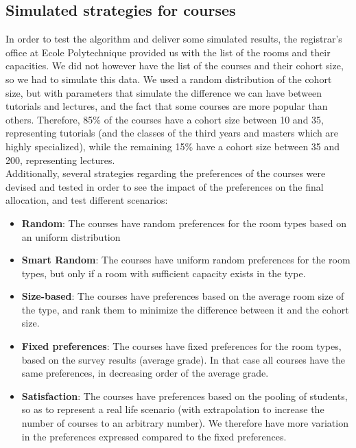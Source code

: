 \documentclass[a4paper, oneside]{article}
\theoremstyle{plain}
\begin{document}
\subsection{Simulated strategies for courses}

In order to test the algorithm and deliver some simulated results, the registrar's office at Ecole Polytechnique provided us with the list of the rooms and their capacities.
We did not however have the list of the courses and their cohort size, so we had to simulate this data. We used a random distribution of the cohort size, but with parameters that
simulate the difference we can have between tutorials and lectures, and the fact that some courses are more popular than others. Therefore, 85\% of the courses have a cohort size between 10 and 35,
representing tutorials (and the classes of the third years and masters which are highly specialized), while the remaining 15\% have a cohort size between 35 and 200, representing lectures.\\

Additionally, several strategies regarding the preferences of the courses were devised and tested in order to see the impact of the preferences on the final allocation, and test different
scenarios: 

\begin{itemize}
	\item \textbf{Random}: The courses have random preferences for the room types based on an uniform distribution
	\item \textbf{Smart Random}: The courses have uniform random preferences for the room types, but only if a room with sufficient capacity exists in the type.
	\item \textbf{Size-based}: The courses have preferences based on the average room size of the type, and rank them to minimize the difference between it and the cohort size.
	\item \textbf{Fixed preferences}: The courses have fixed preferences for the room types, based on the survey results (average grade). In that case all courses have the same preferences, in decreasing order of the average grade.
	\item \textbf{Satisfaction}: The courses have preferences based on the pooling of students, so as to represent a real life scenario (with extrapolation to increase the number of courses to an arbitrary number). 
	We therefore have more variation in the preferences expressed compared to the fixed preferences.
\end{itemize}
\end{document}
